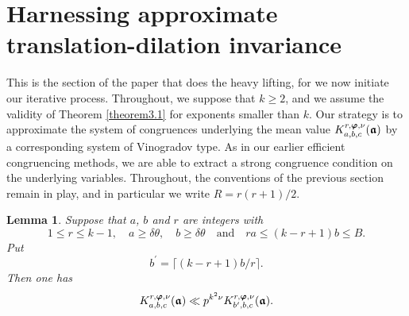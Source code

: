 \documentclass[12pt,reqno]{amsart}
\newtheorem{lemma}[theorem]{Lemma}
\theoremstyle{definition}
\theoremstyle{remark}
\numberwithin{equation}{section}
\def\del{{\delta}} \def\Del{{\Delta}} \def\Deltil{{\widetilde \Delta}}
\def\tet{{\theta}} \def\bftet{{\boldsymbol \theta}}
\def\le{\leqslant} \def\ge{\geqslant} \def\pleq{\preccurlyeq} \def\ple{\prec}
\begin{document}
\section{Harnessing approximate translation-dilation invariance} This is the section of the 
paper that does the heavy lifting, for we now initiate our iterative process. Throughout, we 
suppose that $k\ge 2$, and we assume the validity of Theorem \ref{theorem3.1} for 
exponents smaller than $k$. Our strategy is to approximate the system of congruences 
underlying the mean value $K_{a,b,c}^{r,{\boldsymbol \varphi}, \nu}({\boldsymbol {{\mathfrak a}}})$ by a corresponding 
system of Vinogradov type. As in our earlier efficient congruencing methods, we are able to 
extract a strong congruence condition on the underlying variables. Throughout, the 
conventions of the previous section remain in play, and in particular we write $R=r(r+1)/2$.

\begin{lemma}\label{lemma7.1} Suppose that $a$, $b$ and $r$ are integers with 
\begin{equation}\label{7.1}
1\le r\le k-1,\quad a\ge \del \tet,\quad b\ge \del \tet\quad \text{and}\quad ra\le 
(k-r+1)b\le B.
\end{equation}
Put
\begin{equation}\label{7.2}
b^\prime =\lceil (k-r+1)b/r\rceil.
\end{equation}
Then one has
$$K_{a,b,c}^{r,{\boldsymbol \varphi},\nu}({\boldsymbol {{\mathfrak a}}})\ll p^{k^2\nu}
K_{b^\prime ,b,c}^{r,{\boldsymbol \varphi},\nu}({\boldsymbol {{\mathfrak a}}}).$$
\end{lemma}
\end{document}
